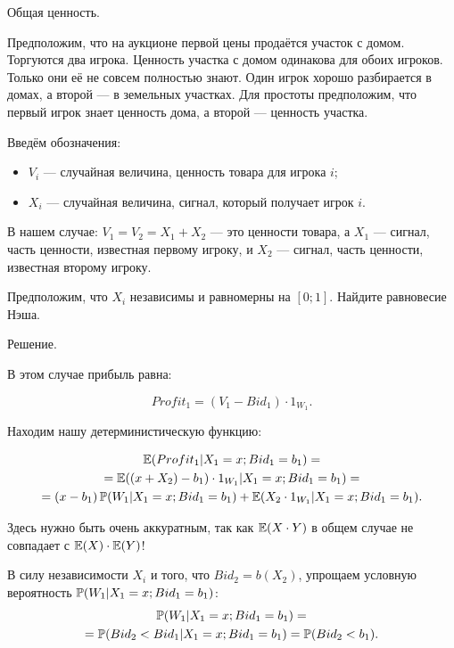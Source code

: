 \begin{myex} Общая ценность.

Предположим, что на аукционе первой цены продаётся участок с домом. Торгуются два игрока. Ценность участка с домом одинакова для обоих игроков. Только они её не совсем полностью знают. Один игрок хорошо разбирается в домах, а второй — в земельных участках. Для простоты предположим, что первый игрок знает ценность дома, а второй — ценность участка.

Введём обозначения:

\begin{itemize}
\item $ V_{i} $ — случайная величина, ценность товара для игрока $ i $;
\item $ X_{i} $ — случайная величина, сигнал, который получает игрок $ i $.
\end{itemize}

В нашем случае: $ V_{1}=V_{2}=X_{1}+X_{2} $ — это ценности товара, а $ X_{1} $ — сигнал, часть ценности, известная первому игроку, и $ X_{2} $ — сигнал, часть ценности, известная второму игроку.

Предположим, что $ X_{i} $ независимы и равномерны на $ [0;1] $. Найдите равновесие Нэша.

Решение.

В этом случае прибыль равна:

\begin{equation}
Profit_{1}=(V_{1}-Bid_{1})\cdot 1_{W_{1}}.
\end{equation}

Находим нашу детерминистическую функцию:

\begin{multline}
\E(Profit_{1}|X_{1}=x; Bid_{1}=b_{1})=\\
=\E((x+X_{2})-b_{1})\cdot 1_{W_{1}}|X_{1}=x; Bid_{1}=b_{1})=\\
=(x-b_{1})\P(W_{1}|X_{1}=x; Bid_{1}=b_{1})+\E(X_{2}\cdot 1_{W_{1}}|X_{1}=x; Bid_{1}=b_{1}).
\end{multline}


Здесь нужно быть очень аккуратным, так как $ \E(X\cdot Y) $ в общем случае не совпадает с $ \E(X)\cdot \E(Y) $!

В силу независимости $ X_{i} $ и того, что $ Bid_{2}=b(X_{2}) $, упрощаем условную вероятность $\P(W_{1}|X_{1}=x ; Bid_{1}=b_{1})$:
\begin{multline}
\P(W_{1}|X_{1}=x; Bid_{1}=b_{1})=\\
=\P(Bid_{2}<Bid_{1}|X_{1}=x; Bid_{1}=b_{1})=\P(Bid_{2}<b_{1}).
\end{multline}


\end{myex}
